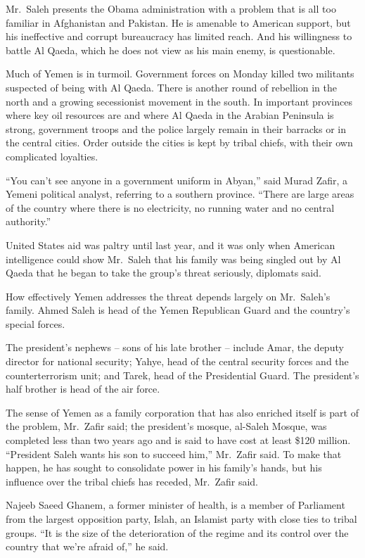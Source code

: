 ﻿\documentclass[12pt]{article}
\begin{document}
Mr.~Saleh presents the Obama administration with a problem that is all too familiar in Afghanistan
and Pakistan. He is amenable to American support, but his ineffective and corrupt bureaucracy has
limited reach. And his willingness to battle Al Qaeda, which he does not view as his main enemy, is
questionable.

Much of Yemen is in turmoil. Government forces on Monday killed two militants suspected of being
with Al Qaeda. There is another round of rebellion in the north and a growing secessionist movement
in the south. In important provinces where key oil resources are and where Al Qaeda in the Arabian
Peninsula is strong, government troops and the police largely remain in their barracks or in the
central cities. Order outside the cities is kept by tribal chiefs, with their own complicated
loyalties.

``You can't see anyone in a government uniform in Abyan,'' said Murad Zafir, a Yemeni political
analyst, referring to a southern province. ``There are large areas of the country where there is no
electricity, no running water and no central authority.''

United States aid was paltry until last year, and it was only when American intelligence could show
Mr.~Saleh that his family was being singled out by Al Qaeda that he began to take the group's threat
seriously, diplomats said.

How effectively Yemen addresses the threat depends largely on Mr.~Saleh's family. Ahmed Saleh is
head of the Yemen Republican Guard and the country's special forces.

The president's nephews -- sons of his late brother -- include Amar, the deputy director for
national security; Yahye, head of the central security forces and the counterterrorism unit; and
Tarek, head of the Presidential Guard. The president's half brother is head of the air force.

The sense of Yemen as a family corporation that has also enriched itself is part of the problem,
Mr.~Zafir said; the president's mosque, al-Saleh Mosque, was completed less than two years ago and
is said to have cost at least \$120 million. ``President Saleh wants his son to succeed him,''
Mr.~Zafir said. To make that happen, he has sought to consolidate power in his family's hands, but
his influence over the tribal chiefs has receded, Mr.~Zafir said.

Najeeb Saeed Ghanem, a former minister of health, is a member of Parliament from the largest
opposition party, Islah, an Islamist party with close ties to tribal groups. ``It is the size of the
deterioration of the regime and its control over the country that we're afraid of,'' he said.
\end{document}
